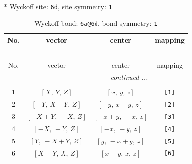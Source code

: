 \documentclass[fleqn,8pt]{jsarticle}
\begin{document}
* Wyckoff site: {\tt 6d}, site symmetry: {\tt 1}
\renewcommand{\arraystretch}{1.2}
\begin{longtable}{cccc}
\caption{Wyckoff bond: {\tt 6a@6d}, bond symmetry: {\tt 1}}
 \\
 \hline \hline
No. & vector & center & mapping \\ \hline \endfirsthead

\multicolumn{3}{l}{\tablename\ \thetable{}} \\
 \hline \hline
No. & vector & center & mapping \\ \hline \endhead

 \hline \hline
\multicolumn{3}{r}{\footnotesize\it continued ...} \\ \endfoot

 \hline \hline
\multicolumn{3}{r}{} \\ \endlastfoot

1 & $\left[ X,\, Y,\, Z \right]$ & $\left[ x,\, y,\, z \right]$ & {\tt [1]} \\ \hline
2 & $\left[ - Y,\, X - Y,\, Z \right]$ & $\left[ - y,\, x - y,\, z \right]$ & {\tt [2]} \\ \hline
3 & $\left[ - X + Y,\, - X,\, Z \right]$ & $\left[ - x + y,\, - x,\, z \right]$ & {\tt [3]} \\ \hline
4 & $\left[ - X,\, - Y,\, Z \right]$ & $\left[ - x,\, - y,\, z \right]$ & {\tt [4]} \\ \hline
5 & $\left[ Y,\, - X + Y,\, Z \right]$ & $\left[ y,\, - x + y,\, z \right]$ & {\tt [5]} \\ \hline
6 & $\left[ X - Y,\, X,\, Z \right]$ & $\left[ x - y,\, x,\, z \right]$ & {\tt [6]} \\
\end{longtable}
\end{document}

